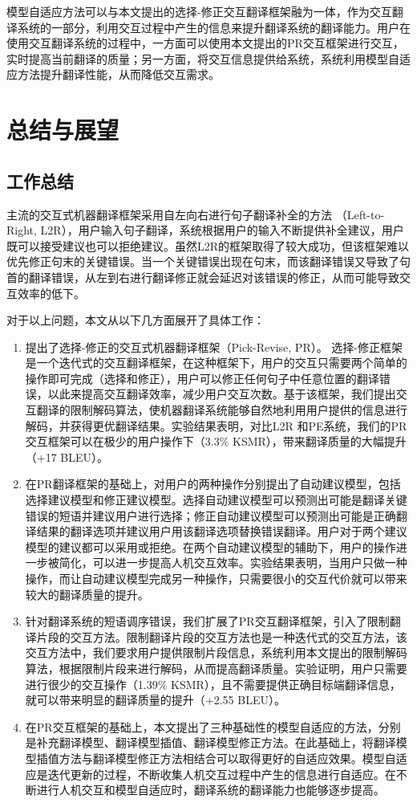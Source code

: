 \documentclass[master, winfont]{njuthesis}
\begin{document}
模型自适应方法可以与本文提出的选择-修正交互翻译框架融为一体，作为交互翻译系统的一部分，利用交互过程中产生的信息来提升翻译系统的翻译能力。用户在使用交互翻译系统的过程中，一方面可以使用本文提出的PR交互框架进行交互，实时提高当前翻译的质量；另一方面，将交互信息提供给系统，系统利用模型自适应方法提升翻译性能，从而降低交互需求。
\chapter{总结与展望}
\section{工作总结}
主流的交互式机器翻译框架采用自左向右进行句子翻译补全的方法 （Left-to-Right, L2R），用户输入句子翻译，系统根据用户的输入不断提供补全建议，用户既可以接受建议也可以拒绝建议。虽然L2R的框架取得了较大成功，但该框架难以优先修正句末的关键错误。当一个关键错误出现在句末，而该翻译错误又导致了句首的翻译错误，从左到右进行翻译修正就会延迟对该错误的修正，从而可能导致交互效率的低下。

对于以上问题，本文从以下几方面展开了具体工作：
\begin{enumerate}
  \item 提出了选择-修正的交互式机器翻译框架（Pick-Revise, PR）。 选择-修正框架是一个迭代式的交互翻译框架，在这种框架下，用户的交互只需要两个简单的操作即可完成（选择和修正），用户可以修正任何句子中任意位置的翻译错误，以此来提高交互翻译效率，减少用户交互次数。基于该框架，我们提出交互翻译的限制解码算法，使机器翻译系统能够自然地利用用户提供的信息进行解码，并获得更优翻译结果。实验结果表明，对比L2R 和PE系统，我们的PR交互框架可以在极少的用户操作下（3.3\% KSMR），带来翻译质量的大幅提升（+17 BLEU）。
  \item 在PR翻译框架的基础上，对用户的两种操作分别提出了自动建议模型，包括选择建议模型和修正建议模型。选择自动建议模型可以预测出可能是翻译关键错误的短语并建议用户进行选择；修正自动建议模型可以预测出可能是正确翻译结果的翻译选项并建议用户用该翻译选项替换错误翻译。用户对于两个建议模型的建议都可以采用或拒绝。在两个自动建议模型的辅助下，用户的操作进一步被简化，可以进一步提高人机交互效率。实验结果表明，当用户只做一种操作，而让自动建议模型完成另一种操作，只需要很小的交互代价就可以带来较大的翻译质量的提升。
  \item 针对翻译系统的短语调序错误，我们扩展了PR交互翻译框架，引入了限制翻译片段的交互方法。限制翻译片段的交互方法也是一种迭代式的交互方法，该交互方法中，我们要求用户提供限制片段信息，系统利用本文提出的限制解码算法，根据限制片段来进行解码，从而提高翻译质量。实验证明，用户只需要进行很少的交互操作（1.39\% KSMR），且不需要提供正确目标端翻译信息，就可以带来明显的翻译质量的提升（+2.55 BLEU）。
  \item 在PR交互框架的基础上，本文提出了三种基础性的模型自适应的方法，分别是补充翻译模型、翻译模型插值、翻译模型修正方法。在此基础上，将翻译模型插值方法与翻译模型修正方法相结合可以取得更好的自适应效果。模型自适应是迭代更新的过程，不断收集人机交互过程中产生的信息进行自适应。在不断进行人机交互和模型自适应时，翻译系统的翻译能力也能够逐步提高。
\end{enumerate}
\end{document}
